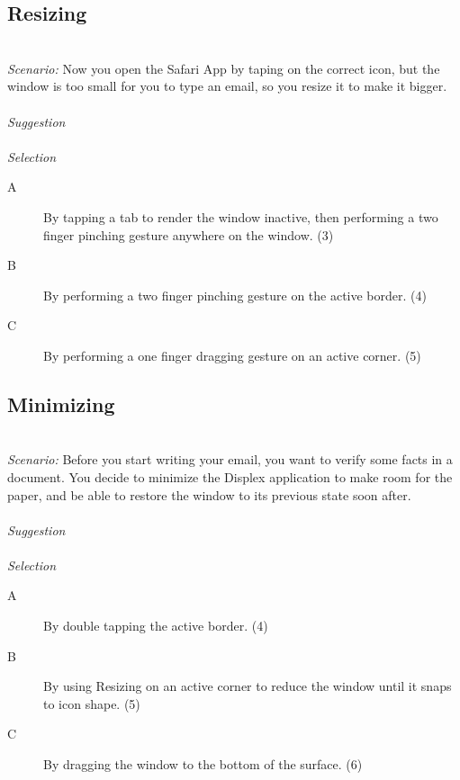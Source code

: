 \subsection{Resizing}
\hfill\\
\emph{Scenario:}
Now you open the Safari App by taping on the correct icon, but the window is too small for you to type an email, so you resize it to make it bigger.
\\\\
\emph{Suggestion}
\\\\
\emph{Selection}
\begin{description}
\item[A]{By tapping a tab to render the window inactive, then performing a two finger pinching gesture anywhere on the window. (3)}
\item[B]{By performing a two finger pinching gesture on the active border. (4)}
\item[C]{By performing a one finger dragging gesture on an active corner. (5)}
\end{description}



\subsection{Minimizing}
\hfill\\
\emph{Scenario:}
Before you start writing your email, you want to verify some facts in a document.
You decide to minimize the Displex application to make room for the paper, and be able to restore the window to its previous state soon after.
\\\\
\emph{Suggestion}
\\\\
\emph{Selection}
\begin{description}
\item[A]{By double tapping the active border. (4)}
\item[B]{By using Resizing on an active corner to reduce the window until it snaps to icon shape. (5)}
\item[C]{By dragging the window to the bottom of the surface. (6)}
\end{description}


